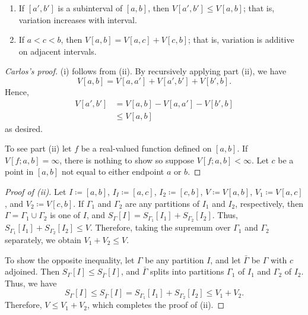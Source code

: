 \begin{theorem}[2.2]
\begin{enumerate}[label=\textnormal{(\roman*)}]
\item If $[a',b']$ is a subinterval of $[a,b]$, then
  $V[a',b']\leq V[a,b]$; that is, variation increases with interval.
\item If $a<c<b$, then $V[a,b]=V[a,c]+V[c,b]$; that is, variation
  is additive on adjacent intervals.
\end{enumerate}
\end{theorem}
\begin{proof}[Carlos's proof]
(i) follows from (ii). By recursively applying part (ii), we have
\[
V[a,b]=V[a,a']+V[a',b']+V[b',b].
\]
Hence,
\begin{align*}
V[a',b']&=V[a,b]-V[a,a']-V[b',b]\\
           &\leq V[a,b]
\end{align*}
as desired.

To see part (ii) let $f$ be a real-valued function defined on $[a,b]$. If
$V[f;a,b]=\infty$, there is nothing to show so suppose
$V[f;a,b]<\infty$. Let $c$ be a point in $[a,b]$ not equal to either
endpoint $a$ or $b$.
\end{proof}
\begin{proof}[Proof of (ii)]
Let $I\coloneqq [a,b]$, $I_I\coloneqq [a,c]$, $I_2\coloneqq [c,b]$,
$V\coloneqq V[a,b]$, $V_1\coloneqq V[a,c]$, and $V_2\coloneqq V[c,b]$. If
$\Gamma_1$ and $\Gamma_2$ are any partitions of $I_1$ and $I_2$,
respectively, then $\Gamma=\Gamma_1\cup\Gamma_2$ is one of $I$, and
$S_\Gamma[I]=S_{\Gamma_1}[I_1]+S_{\Gamma_2}[I_2]$. Thus,
$S_{\Gamma_1}[I_1]+S_{\Gamma_2}[I_2]\leq V$. Therefore, taking the supremum
over $\Gamma_1$ and $\Gamma_2$ separately, we obtain $V_1+V_2\leq V$.

To show the opposite inequality, let $\Gamma$ be any partition $I$, and let
$\bar\Gamma$ be $\Gamma$ with $c$ adjoined. Then $S_\Gamma[I]\leq
S_{\bar\Gamma}[I]$, and $\bar\Gamma$ splits into partitions
$\Gamma_1$ of $I_1$ and $\Gamma_2$ of $I_2$. Thus, we have
\[
S_\Gamma[I]\leq
S_{\bar\Gamma}[I]=S_{\Gamma_1}[I_1]+S_{\Gamma_2}[I_2]\leq V_1+V_2.
\]
Therefore, $V\leq V_1+V_2$, which completes the proof of (ii).
\end{proof}

